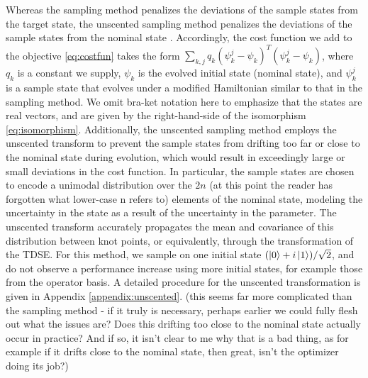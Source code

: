 Whereas the sampling method penalizes the deviations of the sample states
from the target state, the unscented sampling method
penalizes the deviations of the sample states from the nominal state
\cite{howell2020direct, lee2013sigma,
  thangavel2020robust}. Accordingly, the cost function we add
to the objective \eqref{eq:costfun} takes the form
$\sum_{k, j} q_{k} (\psi^{j}_{k} - \psi_{k})^{T}
(\psi^{j}_{k} - \psi_{k})$, where $q_{k}$ is a
constant we supply, $\psi_{k}$ is
the evolved initial state (nominal state), and $\psi^{j}_{k}$ is a sample state
that evolves under a modified Hamiltonian similar to that in the sampling method.
We omit bra-ket notation here to emphasize that
the states are real vectors, and are given by the right-hand-side of the
isomorphism \eqref{eq:isomorphism}. Additionally,
the unscented sampling method employs the unscented transform
\cite{julier2004unscented, uhlmann1995dynamic}
to prevent the sample states
from drifting too far or close to the nominal state during evolution,
which would result in exceedingly large or small deviations in the cost function.
In particular, the sample states are chosen to encode a unimodal distribution over
the $2n$ (at this point the reader has forgotten what lower-case n refers to) elements of the nominal state, modeling the uncertainty in the state
as a result of the uncertainty in the parameter. The unscented transform
accurately propagates the mean and covariance of this distribution between
knot points, or equivalently, through the transformation of the TDSE.
For this method, we sample on one initial state $(\ket{0} + i\ket{1}) / \sqrt{2}$,
and do not observe a performance increase
using more initial states, for example those from the operator basis.
A detailed procedure for the unscented transformation is given
in Appendix \ref{appendix:unscented}. (this seems far more complicated than the sampling method - if it truly is necessary, perhaps earlier we could fully flesh out what the issues are? Does this drifting too close to the nominal state actually occur in practice? And if so, it isn't clear to me why that is a bad thing, as for example if it drifts close to the nominal state, then great, isn't the optimizer doing its job?)

